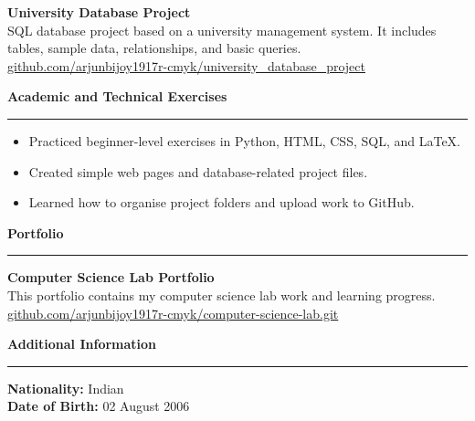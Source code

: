 \documentclass[10pt,a4paper]{article}
\begin{document}
\begin{minipage}[t][27.5cm][t]{0.66\textwidth}
\vspace{0.25cm}

\textbf {University Database Project}\\
SQL database project based on a university management system. It includes tables, sample data, relationships, and basic queries.\\
\href{https://github.com/arjunbijoy1917r-cmyk/university_database_project}{github.com/arjunbijoy1917r-cmyk/university\_database\_project}

\vspace{0.3cm}

{\Large \textbf{Academic and Technical Exercises}}\\[-0.1cm]
\textcolor{accent}{\rule{1.5cm}{1pt}}

\vspace{0.2cm}

\begin {itemize}
    \item Practiced beginner-level exercises in Python, HTML, CSS, SQL, and LaTeX.
    \item Created simple web pages and database-related project files.
    \item Learned how to organise project folders and upload work to GitHub.
\end{itemize}

\vspace{0.3cm}

{\Large \textbf{Portfolio}}\\[-0.1cm]
\textcolor{accent}{\rule{1.5cm}{1pt}}

\vspace{0.2cm}

\textbf{Computer Science Lab Portfolio}\\
This portfolio contains my computer science lab work and learning progress.\\
\href{https://github.com/arjunbijoy1917r-cmyk/computer-science-lab.git}{github.com/arjunbijoy1917r-cmyk/computer-science-lab.git}

\vspace{0.3cm}

{\Large \textbf{Additional Information}}\\[-0.1cm]
\textcolor{accent}{\rule{1.5cm}{1pt}}

\vspace{0.2cm}

\textbf{Nationality:} Indian\\
\textbf{Date of Birth:} 02 August 2006

\end{minipage}
\end{document}
